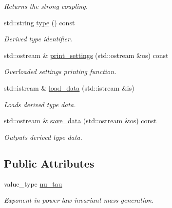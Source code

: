 \begin{DoxyCompactItemize}
\begin{DoxyCompactList}\small\item\em Returns the strong coupling. \end{DoxyCompactList}\item 
\hypertarget{a00255_a42bf9e4defb01805c9d591d5c011a56c}{std\-::string \hyperlink{a00255_a42bf9e4defb01805c9d591d5c011a56c}{type} () const }\label{a00255_a42bf9e4defb01805c9d591d5c011a56c}

\begin{DoxyCompactList}\small\item\em Derived type identifier. \end{DoxyCompactList}\item 
\hypertarget{a00255_a9c2dbca84f1612729128d0727899ef46}{std\-::ostream \& \hyperlink{a00255_a9c2dbca84f1612729128d0727899ef46}{print\-\_\-settings} (std\-::ostream \&os) const }\label{a00255_a9c2dbca84f1612729128d0727899ef46}

\begin{DoxyCompactList}\small\item\em Overloaded settings printing function. \end{DoxyCompactList}\item 
\hypertarget{a00255_a3b8204665c37ce503a2ce76a054213cb}{std\-::istream \& \hyperlink{a00255_a3b8204665c37ce503a2ce76a054213cb}{load\-\_\-data} (std\-::istream \&is)}\label{a00255_a3b8204665c37ce503a2ce76a054213cb}

\begin{DoxyCompactList}\small\item\em Loads derived type data. \end{DoxyCompactList}\item 
\hypertarget{a00255_aa746f25dbce88d44b13a9029fddb66c0}{std\-::ostream \& \hyperlink{a00255_aa746f25dbce88d44b13a9029fddb66c0}{save\-\_\-data} (std\-::ostream \&os) const }\label{a00255_aa746f25dbce88d44b13a9029fddb66c0}

\begin{DoxyCompactList}\small\item\em Outputs derived type data. \end{DoxyCompactList}\end{DoxyCompactItemize}
\subsection*{Public Attributes}
\begin{DoxyCompactItemize}
\item 
\hypertarget{a00255_a1aa104775ec464a6cc8feec1be785142}{value\-\_\-type \hyperlink{a00255_a1aa104775ec464a6cc8feec1be785142}{nu\-\_\-tau}}\label{a00255_a1aa104775ec464a6cc8feec1be785142}

\begin{DoxyCompactList}\small\item\em Exponent in power-\/law invariant mass generation. \end{DoxyCompactList}\end{DoxyCompactItemize}
